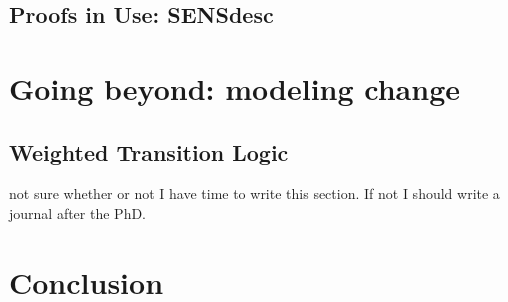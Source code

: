 \documentclass[11pt,a4paper,twoside]{book}
\newcommand\blankpage{%
    \null
    \thispagestyle{empty}%
    \addtocounter{page}{-1}%
    \newpage}
\begin{document}
\section{Proofs in Use: SENSdesc}\label{sensdesc}



\chapter{Going beyond: modeling change}
\section{Weighted Transition Logic}
not sure whether or not I have time to write this section. If not I should write a journal after the PhD.


\chapter{Conclusion}\label{concl}\label{conclusion}



% 
% 
%     



\begin{appendices}
%    

\end{appendices}


\backmatter


    
\end{document}
